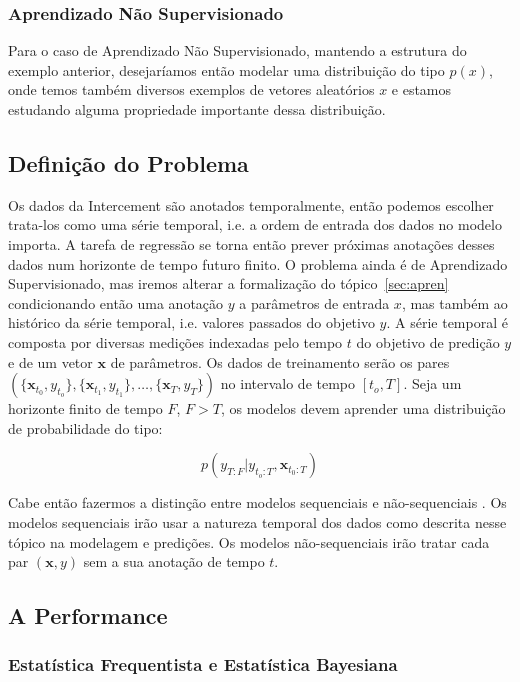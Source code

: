 \subsubsection{Aprendizado Não Supervisionado}

Para o caso de Aprendizado Não Supervisionado, mantendo a estrutura do exemplo
anterior, desejaríamos então modelar uma distribuição do tipo $p(x)$, onde temos
também diversos exemplos de vetores aleatórios $x$ e estamos estudando alguma propriedade importante dessa distribuição.


\subsection{Definição do Problema}


Os dados da Intercement são anotados temporalmente, então podemos escolher trata-los como uma série temporal, i.e. a ordem de entrada dos dados no modelo importa. A tarefa de regressão se torna então prever próximas anotações desses dados num horizonte de tempo futuro finito. O problema ainda é de Aprendizado Supervisionado, mas iremos alterar a formalização do tópico~\ref{sec:apren} condicionando então uma anotação $y$ a parâmetros de entrada $x$, mas também ao histórico da série temporal, i.e. valores passados do objetivo $y$. A série temporal é composta por diversas medições indexadas pelo tempo $t$ do objetivo de predição $y$ e de um vetor $\textbf{x}$ de parâmetros. Os dados de treinamento serão os pares $(\{\textbf{x}_{t_0},y_{t_o}\},\{\textbf{x}_{t_1},y_{t_1}\}, \dots, \{\textbf{x}_{T},y_{T}\})$ no intervalo de tempo $[t_o,T]$. Seja um horizonte finito de tempo $F$, $F > T$, os modelos devem aprender uma distribuição de probabilidade do tipo:

\[ p(y_{T:F} | y_{t_{o}:T},\textbf{x}_{t_{0}:T}) \]

Cabe então fazermos a distinção entre modelos sequenciais e não-sequenciais \cite{dlbook}. Os modelos sequenciais irão usar a natureza temporal dos dados como descrita nesse tópico na modelagem e predições. Os modelos não-sequenciais irão tratar cada par $(\textbf{x},y)$ sem a sua anotação de tempo $t$.


\subsection{A Performance}
\label{sec:metricas}
\subsubsection{Estatística Frequentista e Estatística Bayesiana}
 
